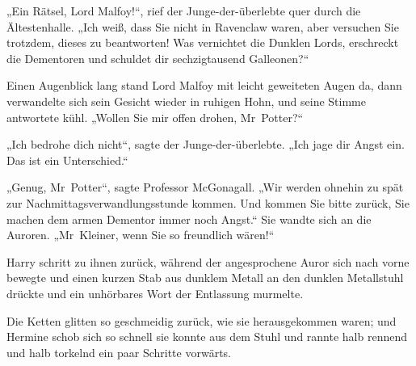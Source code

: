 „Ein Rätsel, Lord Malfoy!“, rief der Junge-der-überlebte quer durch die Ältestenhalle. „Ich weiß, dass Sie nicht in Ravenclaw waren, aber versuchen Sie trotzdem, dieses zu beantworten! Was vernichtet die Dunklen Lords, erschreckt die Dementoren und schuldet dir sechzigtausend Galleonen?“

Einen Augenblick lang stand Lord Malfoy mit leicht geweiteten Augen da, dann verwandelte sich sein Gesicht wieder in ruhigen Hohn, und seine Stimme antwortete kühl.
„Wollen Sie mir offen drohen, Mr~Potter?“

„Ich bedrohe dich nicht“, sagte der Junge-der-überlebte. „Ich jage dir Angst ein. Das ist ein Unterschied.“

„Genug, Mr~Potter“, sagte Professor McGonagall. „Wir werden ohnehin zu spät zur Nachmittagsverwandlungsstunde kommen. Und kommen Sie bitte zurück, Sie machen dem armen Dementor immer noch Angst.“
Sie wandte sich an die Auroren.
„Mr~Kleiner, wenn Sie so freundlich wären!“

Harry schritt zu ihnen zurück, während der angesprochene Auror sich nach vorne bewegte und einen kurzen Stab aus dunklem Metall an den dunklen Metallstuhl drückte und ein unhörbares Wort der Entlassung murmelte.

Die Ketten glitten so geschmeidig zurück, wie sie herausgekommen waren; und Hermine schob sich so schnell sie konnte aus dem Stuhl und rannte halb rennend und halb torkelnd ein paar Schritte vorwärts.

